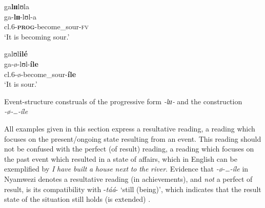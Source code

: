 \documentclass[output=paper,newtxmath,modfonts,nonflat,draftmode]{langsci/langscibook}
\begin{document}
\ea \label{ex:kanijo:16}
    \ea 
    \glll ga\textbf{lɪɪ}lʊla\\
    ga-\textbf{lɪɪ}-lʊl-a\\
    cl.6-\textbf{\textsc{prog}}-become\_sour-\textsc{fv}\\
    \glt ‘It is becoming sour.’
    
    \ex 
    \glll galʊl\textbf{ilé}\\
    ga-ø-lʊl-\textbf{íle}\\
    cl.6-ø-become\_sour-\textbf{íle}\\
    \glt ‘It is sour.’
    
    \z
\z
\begin{exe}
\ex Event-structure construals of the progressive form \textit{‑lɪɪ‑} and the construction \textit{‑ø‑…‑íle}\ \label{ex;kanijo:17rev}\
\begin{xlist}
\ex{}
\ex{}
\end{xlist}
\end{exe}

                
All examples given in this section express a resultative reading, a reading which focuses on the present/ongoing state resulting from an event. This reading should not be confused with the perfect (of result) reading, a reading which focuses on the past event which resulted in a state of affairs, which in English can be exemplified by \textit{I} \textit{have} \textit{built} \textit{a} \textit{house} \textit{next} \textit{to} \textit{the} \textit{river}. Evidence that \textit{-ø-…-íle} in Nyamwezi denotes a resultative reading (in achievements), and \textit{not} a perfect of result, is its compatibility with -\textit{táá}- ‘still (being)’, which indicates that the result state of the situation still holds (is extended) . 
\end{document}
